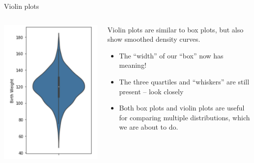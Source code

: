 \documentclass[aspectratio=169]{../latex_main/tntbeamer}  %
\begin{document}
	
	\begin{frame}[c]{Violin plots}
	     \begin{columns}
            \begin{column}{.5\textwidth}

                       \includegraphics[scale=.55]{Bild41}

            \end{column}
            
            
            \begin{column}{.5\textwidth}

                Violin plots are similar to box plots, but also show smoothed density curves.
                \begin{itemize}
                    \item The “width” of our “box” now has meaning!
                    \item The three quartiles and “whiskers” are still present – look closely
                    \item Both box plots and violin plots are useful for comparing multiple distributions, which we are about to do.
                \end{itemize}
                
            \end{column}
        \end{columns}
	\end{frame}
\end{document}
